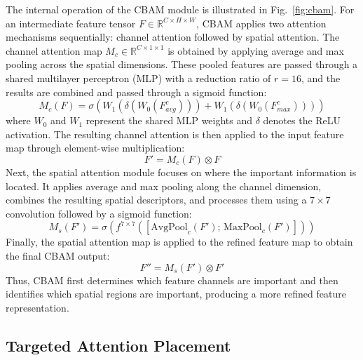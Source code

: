\documentclass[conference]{IEEEtran}
\begin{document}
The internal operation of the CBAM module is illustrated in Fig.~\ref{fig:cbam}. For an intermediate feature tensor $F\in\mathbb{R}^{C\times H\times W}$, CBAM applies two attention mechanisms sequentially: channel attention followed by spatial attention. The channel attention map $M_c\in\mathbb{R}^{C\times1\times1}$ is obtained by applying average and max pooling across the spatial dimensions. These pooled features are passed through a shared multilayer perceptron (MLP) with a reduction ratio of $r=16$, and the results are combined and passed through a sigmoid function:
\begin{equation}
M_c(F) = \sigma\!\left(W_1\!\left(\delta\!\left(W_0\!\left(F^{c}_{avg}\right)\right)\right) + W_1\!\left(\delta\!\left(W_0\!\left(F^{c}_{max}\right)\right)\right)\right)
\end{equation}
where $W_0$ and $W_1$ represent the shared MLP weights and $\delta$ denotes the ReLU activation. The resulting channel attention is then applied to the input feature map through element-wise multiplication:
\begin{equation}
F' = M_c(F) \otimes F
\end{equation}
Next, the spatial attention module focuses on where the important information is located. It applies average and max pooling along the channel dimension, combines the resulting spatial descriptors, and processes them using a $7\times7$ convolution followed by a sigmoid function:
\begin{equation}
M_s(F') = \sigma\!\left(f^{7\times7}\!\left(\left[\mathrm{AvgPool}_c(F');\, \mathrm{MaxPool}_c(F')\right]\right)\right)
\end{equation}
Finally, the spatial attention map is applied to the refined feature map to obtain the final CBAM output:
\begin{equation}
F'' = M_s(F') \otimes F'
\end{equation}
Thus, CBAM first determines which feature channels are important and then identifies which spatial regions are important, producing a more refined feature representation.

\subsection{Targeted Attention Placement}
\end{document}
